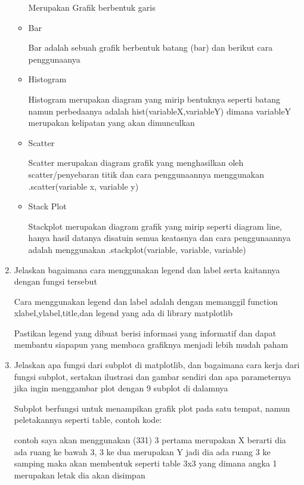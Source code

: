 \begin{enumerate}
\begin{itemize}
	Merupakan Grafik berbentuk garis
	
	
	\item Bar
	
	Bar adalah sebuah grafik berbentuk batang (bar) dan berikut cara penggunaanya
	
	
	\item Histogram
	
	Histogram merupakan diagram yang mirip bentuknya seperti batang namun perbedaanya adalah hist(variableX,variableY) dimana variableY merupakan kelipatan yang akan dimunculkan
	
	
	\item Scatter
	
	Scatter merupakan diagram grafik yang menghasilkan oleh scatter/penyebaran titik dan cara penggunaannya menggunakan .scatter(variable x, variable y)
	
	
	\item Stack Plot
	
	Stackplot merupakan diagram grafik yang mirip seperti diagram line, hanya hasil datanya disatuin semua keatasnya dan cara penggunaannya adalah menggunakan .stackplot(variable, variable, variable)
	
\end{itemize}

\item Jelaskan bagaimana cara menggunakan legend dan label serta kaitannya dengan fungsi tersebut

Cara menggunakan legend dan label adalah dengan memanggil function xlabel,ylabel,title,dan legend yang ada di library matplotlib

Pastikan legend yang dibuat berisi informasi yang informatif dan dapat membantu siapapun yang membaca grafiknya menjadi lebih mudah paham

\item Jelaskan apa fungsi dari subplot di matplotlib, dan bagaimana cara kerja dari fungsi subplot, sertakan ilustrasi dan gambar sendiri dan apa parameternya jika ingin menggambar plot dengan 9 subplot di dalamnya

Subplot berfungsi untuk menampikan grafik plot pada satu tempat, namun peletakannya seperti table, contoh kode:

contoh saya akan menggunakan (331) 3 pertama merupakan X berarti dia ada ruang ke bawah 3, 3 ke dua merupakan Y jadi dia ada ruang 3 ke samping maka akan membentuk seperti table 3x3 yang dimana angka 1 merupakan letak dia akan disimpan 


\end{enumerate}
